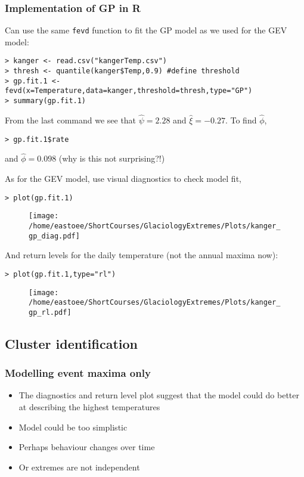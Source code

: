 \documentclass[dvipsnames]{beamer}
\begin{document}
\begin{frame}[fragile]
\frametitle{Implementation of GP in \textsf{R}}
Can use the same \texttt{fevd} function to fit the GP model as we used for the GEV model:
\begin{verbatim}
> kanger <- read.csv("kangerTemp.csv")
> thresh <- quantile(kanger$Temp,0.9) #define threshold
> gp.fit.1 <- fevd(x=Temperature,data=kanger,threshold=thresh,type="GP")
> summary(gp.fit.1)
\end{verbatim}
From the last command we see that $\hat\psi=2.28$ and $\hat\xi=-0.27$. To find $\hat\phi$,
\begin{verbatim}
> gp.fit.1$rate
\end{verbatim}
and $\hat\phi=0.098$ (why is this not surprising?!)
\end{frame}

\begin{frame}[fragile]
As for the GEV model, use visual diagnostics to check model fit,
\begin{verbatim}
> plot(gp.fit.1)
\end{verbatim}
\begin{figure}
\centering
{\texttt{[image: /home/eastoee/ShortCourses/GlaciologyExtremes/Plots/kanger\_gp\_diag.pdf]}}
\end{figure}
\end{frame}

\begin{frame}[fragile]
And return levels for the daily temperature (not the annual maxima now):
\begin{verbatim}
> plot(gp.fit.1,type="rl")
\end{verbatim}
\begin{figure}
\centering
{\texttt{[image: /home/eastoee/ShortCourses/GlaciologyExtremes/Plots/kanger\_gp\_rl.pdf]}}
\end{figure}
\end{frame}


\subsection{Cluster identification}

\begin{frame}
\frametitle{Modelling event maxima only}
\begin{itemize}
\item
The diagnostics and return level plot suggest that the model could do better at describing the highest temperatures
\item
Model could be too simplistic
\item
Perhaps behaviour changes over time
\item
Or extremes are not independent
\end{itemize}
\end{frame}
\end{document}
